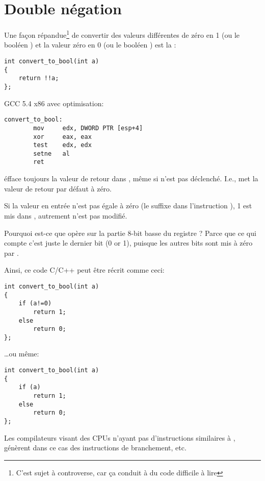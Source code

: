 \section{Double négation}

Une façon répandue\footnote{C'est sujet à controverse, car ça conduit à du code difficile
à lire} de convertir des valeurs différentes de zéro en 1 (ou le booléen )
et la valeur zéro en 0 (ou le booléen ) est la :

\begin{lstlisting}[style=customc]
int convert_to_bool(int a)
{
	return !!a;
};
\end{lstlisting}

GCC 5.4 x86 avec optimisation:

\begin{lstlisting}[style=customasmx86]
convert_to_bool:
        mov     edx, DWORD PTR [esp+4]
        xor     eax, eax
        test    edx, edx
        setne   al
        ret
\end{lstlisting}

 éfface toujours la valeur de retour dans \EAX, même si  n'est
pas déclenché. I.e.,  met la valeur de retour par défaut à zéro.

Si la valeur en entrée n'est pas égale à zéro (le suffixe  dans l'instruction
), 1 est mis dans \AL, autrement \AL n'est pas modifié.

Pourquoi est-ce que  opère sur la partie 8-bit basse du registre \EAX?
Parce que ce qui compte c'est juste le dernier bit (0 or 1), puisque les autres bits
sont mis à zéro par .

Ainsi, ce code C/C++ peut être récrit comme ceci:

\begin{lstlisting}[style=customc]
int convert_to_bool(int a)
{
	if (a!=0)
		return 1;
	else
		return 0;
};
\end{lstlisting}

\dots ou même:

\begin{lstlisting}[style=customc]
int convert_to_bool(int a)
{
	if (a)
		return 1;
	else
		return 0;
};
\end{lstlisting}

Les compilateurs visant des \ac{CPU}s n'ayant pas d'instructions similaires à ,
génèrent dans ce cas des instructions de branchement, etc.
